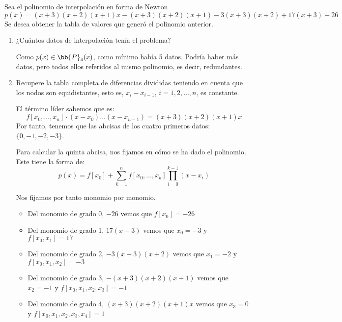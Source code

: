 \begin{ejercicio}
    Sea el polinomio de interpolación en forma de Newton
    \begin{equation*}
        p(x) = (x + 3)(x + 2)(x + 1)x - (x + 3)(x + 2)(x + 1) - 3(x + 3)(x + 2) + 17(x + 3) - 26
    \end{equation*}
    Se desea obtener la tabla de valores que generó el polinomio anterior.
    \begin{enumerate}
        \item ¿Cuántos datos de interpolación tenía el problema?

        Como $p(x)\in \bb{P}_4(x)$, como mínimo había 5 datos. Podría haber más datos, pero todos ellos referidos al mismo polinomio, es decir, redundantes.
        
        \item Recupere la tabla completa de diferencias divididas teniendo en cuenta que los nodos son equidistantes, esto es, $x_i - x_{i-1}$, $i = 1, 2, \dots , n$, es constante.

        El término líder sabemos que es:
        \begin{equation*}
            f[x_0,\dots,x_n]\cdot (x-x_0)\dots(x-x_{n-1}) = (x + 3)(x + 2)(x + 1)x
        \end{equation*}
        Por tanto, tenemos que las abcisas de los cuatro primeros datos: $\{0, -1, -2, -3\}$. 

        Para calcular la quinta abcisa, nos fijamos en cómo se ha dado el polinomio. Este tiene la forma de:
        \begin{equation*}
            p(x) = f[x_0] + \sum_{k=1}^n f[x_0,\dots, x_k]\prod_{i=0}^{k-1} (x-x_i)
        \end{equation*}

        Nos fijamos por tanto monomio por monomio.
        \begin{itemize}
            \item Del monomio de grado 0, $-26$ vemos que $f[x_0]=-26$
            \item Del monomio de grado 1, $17(x+3)$ vemos que $x_0=-3$ y $f[x_0,x_1]=17$
            \item Del monomio de grado 2, $-3(x+3)(x+2)$ vemos que $x_1=-2$ y $f[x_0,x_1, x_2]=-3$
            \item Del monomio de grado 3, $-(x+3)(x+2)(x+1)$ vemos que $x_2=-1$ y $f[x_0,x_1, x_2, x_3]=-1$
            \item Del monomio de grado 4, $(x+3)(x+2)(x+1)x$ vemos que $x_3=0$ y $f[x_0,x_1, x_2, x_3, x_4]=1$
        \end{itemize}


\end{enumerate}
\end{ejercicio}
